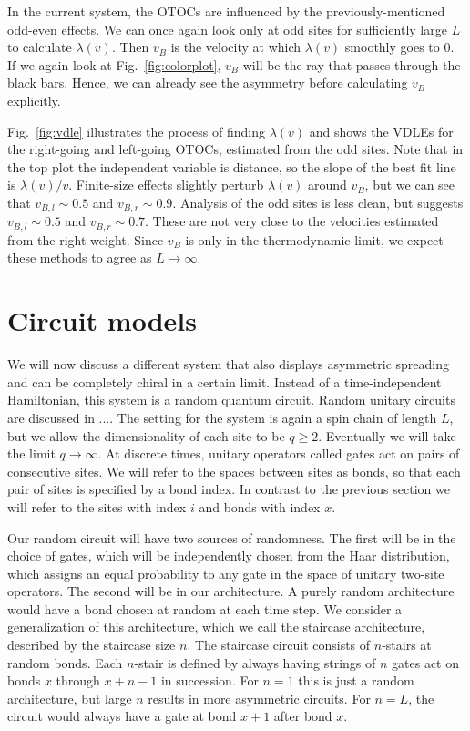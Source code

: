 \documentclass[aps,prx,reprint,superscriptaddress, longbibliography]{revtex4-1}
\newcommand{\charlie}[1]{{\color{Magenta}{{#1}}}}
\begin{document}
In the current system, the OTOCs are influenced by the previously-mentioned odd-even effects. We can once again look only at odd sites for sufficiently large $L$ to calculate $\lambda(v)$. Then $v_B$ is the velocity at which $\lambda(v)$ smoothly goes to 0. If we again look at Fig.~\ref{fig:colorplot}, $v_B$ will be the ray that passes through the black bars. Hence, we can already see the asymmetry before calculating $v_B$ explicitly. 

Fig.~\ref{fig:vdle} illustrates the process of finding $\lambda(v)$ and shows the VDLEs for the right-going and left-going OTOCs, estimated from the odd sites. Note that in the top plot the independent variable is distance, so the slope of the best fit line is $\lambda(v)/v$.
Finite-size effects slightly perturb $\lambda(v)$ around $v_B$, but we can see that $v_{B,l} \sim 0.5$ and $v_{B,r} \sim 0.9$. Analysis of the odd sites is less clean, but suggests $v_{B,l} \sim 0.5$ and $v_{B,r} \sim 0.7$.
These are not very close to the velocities estimated from the right weight. Since $v_B$ is \charlie{well defined} only in the thermodynamic limit, we expect these methods to agree as $L\to\infty$.



\section{Circuit models} \label{sec:circ}

We will now discuss a different system that also displays asymmetric spreading and can be completely chiral in a certain limit. Instead of a time-independent Hamiltonian, this system is a random quantum circuit. Random unitary circuits are discussed in .... The setting for the system is again a spin chain of length $L$, but we allow the dimensionality of each site to be $q\ge2$. Eventually we will take the limit $q\to\infty$. At discrete times, unitary operators called gates act on pairs of consecutive sites. We will refer to the spaces between sites as bonds, so that each pair of sites is specified by a bond index. In contrast to the previous section we will refer to the sites with index $i$ and bonds with index $x$.

Our random circuit will have two sources of randomness. The first will be in the choice of gates, which will be independently chosen from the Haar distribution, which assigns an equal probability to any gate in the space of unitary two-site operators. The second will be in our architecture. A purely random architecture would have a bond chosen at random at each time step. We consider a generalization of this architecture, which we call the staircase architecture, described by the staircase size $n$. The staircase circuit consists of $n$-stairs at random bonds. 
Each $n$-stair is defined by always having strings of $n$ gates act on bonds $x$ through $x+n-1$ in succession. For $n=1$ this is just a random architecture, but large $n$ results in more asymmetric circuits. For $n=L$, the circuit would always have a gate at bond $x+1$ after bond $x$.
\end{document}
